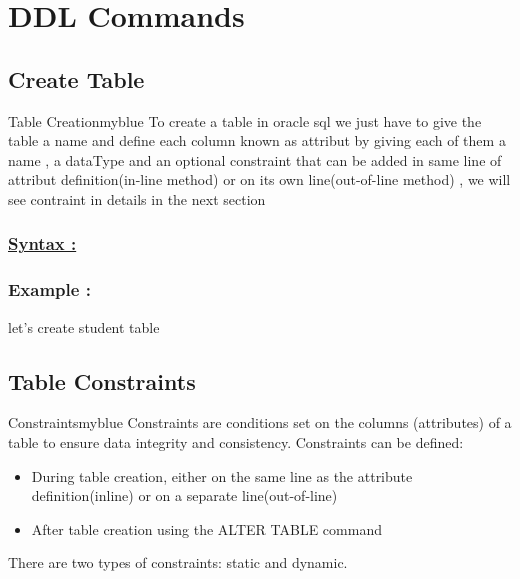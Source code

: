 \newpage
\section{DDL Commands}
\subsection{Create Table}
\begin{prettyBox}{Table Creation}{myblue}
To create a table in oracle sql we just have to give the table a name and define each column known as attribut
by giving each of them a name , a dataType and an optional constraint that can be added in same line of
attribut definition(in-line method) or on its own line(out-of-line method) , we will see contraint in details in the next section
\end{prettyBox}

\vspace{0.5cm}
\subsubsection*{\underline{Syntax :}}




\vspace{0.5cm}
\subsubsection*{Example :} let's create student table 



\vspace{0.5cm}
\subsection{Table Constraints}

\begin{prettyBox}{Constraints}{myblue}
Constraints are conditions set on the columns (attributes) of a table to ensure data integrity and consistency. Constraints can be defined:
\begin{itemize}
    \item During table creation, either on the same line as the attribute definition(inline) or on a separate line(out-of-line)
    \item After table creation using the ALTER TABLE command
\end{itemize}

There are two types of constraints: static and dynamic.
\end{prettyBox}

